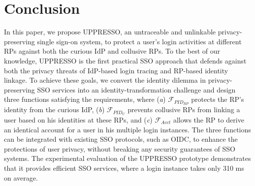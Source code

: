 \section{Conclusion}
\label{sec:conclusion}
In this paper, we propose UPPRESSO, an untraceable and unlinkable privacy-preserving single sign-on system,
 to protect a user's login activities at different RPs against both the curious IdP and collusive RPs.
To the best of our knowledge,
 UPPRESSO is the first practical SSO approach
    that defends against both the privacy threats of IdP-based login tracing and RP-based identity linkage.
To achieve these goals, we convert the identity dilemma in privacy-preserving SSO services into an identity-transformation challenge
 and design three functions satisfying the requirements,
 where (\emph{a}) $\mathcal{F}_{PID_{RP}}$ protects the RP's identity from the curious IdP,
(\emph{b})  $\mathcal{F}_{PID_{U}}$ prevents collusive RPs from linking a user based on his identities at these RPs,
 and (\emph{c}) $\mathcal{F}_{Acct}$ allows the RP to derive an identical account for a user in his multiple login instances.
The three functions can be integrated with existing SSO protocols,
    such as OIDC,
    to enhance the protections of user privacy,
    without breaking any security guarantees of  SSO systems.
The experimental evaluation of the UPPRESSO prototype demonstrates
 that it provides efficient SSO services, where a login instance takes only 310 ms on average.
